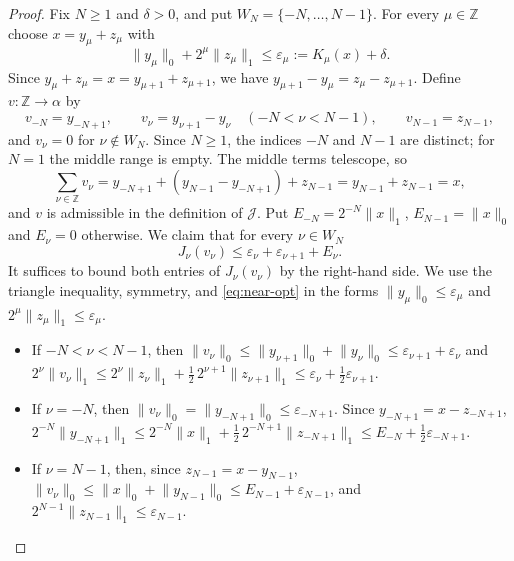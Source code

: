 \documentclass[11pt]{article}
\theoremstyle{remark}
\newcommand{\norm}[2]{\lVert #1\rVert_{#2}}
\newcommand{\cJ}{\mathcal J}
\newcommand{\Z}{\mathbb Z}
\begin{document}
\begin{proof}
  Fix \(N \ge 1\) and \(\delta > 0\), and put \(W_N = \{-N, \dots, N-1\}\). For every
  \(\mu \in \Z\) choose \(x = y_\mu + z_\mu\) with
  \begin{equation}\label{eq:near-opt}
    \norm{y_\mu}{0} + 2^\mu\norm{z_\mu}{1} \le \varepsilon_\mu := K_\mu(x) + \delta .
  \end{equation}
  Since \(y_\mu + z_\mu = x = y_{\mu+1} + z_{\mu+1}\), we have
  \(y_{\mu+1} - y_\mu = z_\mu - z_{\mu+1}\). Define \(v\colon \Z \to \alpha\) by
  \[
    v_{-N} = y_{-N+1}, \qquad v_\nu = y_{\nu+1} - y_\nu \quad (-N < \nu < N-1), \qquad
    v_{N-1} = z_{N-1},
  \]
  and \(v_\nu = 0\) for \(\nu \notin W_N\). Since \(N \ge 1\), the indices \(-N\) and
  \(N-1\) are distinct; for \(N = 1\) the middle range is empty. The middle terms telescope, so
  \[
    \sum_{\nu\in\Z} v_\nu = y_{-N+1} + (y_{N-1} - y_{-N+1}) + z_{N-1} = y_{N-1} + z_{N-1} = x,
  \]
  and \(v\) is admissible in the definition of \(\cJ\). Put \(E_{-N} = 2^{-N}\norm{x}{1}\),
  \(E_{N-1} = \norm{x}{0}\) and \(E_\nu = 0\) otherwise. We claim that for every
  \(\nu \in W_N\)
  \begin{equation}\label{eq:J-bound}
    J_\nu(v_\nu) \le \varepsilon_\nu + \varepsilon_{\nu+1} + E_\nu .
  \end{equation}
  It suffices to bound both entries of \(J_\nu(v_\nu)\) by the right-hand side. We use the
  triangle inequality, symmetry, and \eqref{eq:near-opt} in the forms
  \(\norm{y_\mu}{0} \le \varepsilon_\mu\) and \(2^\mu\norm{z_\mu}{1} \le \varepsilon_\mu\).
  \begin{itemize}
    \item If \(-N < \nu < N-1\), then
      \(\norm{v_\nu}{0} \le \norm{y_{\nu+1}}{0} + \norm{y_\nu}{0} \le \varepsilon_{\nu+1} +
      \varepsilon_\nu\) and
      \(2^\nu\norm{v_\nu}{1} \le 2^\nu\norm{z_\nu}{1} + \tfrac12\, 2^{\nu+1}\norm{z_{\nu+1}}{1}
      \le \varepsilon_\nu + \tfrac12\varepsilon_{\nu+1}\).
    \item If \(\nu = -N\), then \(\norm{v_\nu}{0} = \norm{y_{-N+1}}{0} \le \varepsilon_{-N+1}\).
      Since \(y_{-N+1} = x - z_{-N+1}\),
      \(2^{-N}\norm{y_{-N+1}}{1} \le 2^{-N}\norm{x}{1} + \tfrac12\,2^{-N+1}\norm{z_{-N+1}}{1}
      \le E_{-N} + \tfrac12\varepsilon_{-N+1}\).
    \item If \(\nu = N-1\), then, since \(z_{N-1} = x - y_{N-1}\),
      \(\norm{v_\nu}{0} \le \norm{x}{0} + \norm{y_{N-1}}{0} \le E_{N-1} + \varepsilon_{N-1}\),
      and \(2^{N-1}\norm{z_{N-1}}{1} \le \varepsilon_{N-1}\).
  \end{itemize}


\end{proof}
\end{document}
